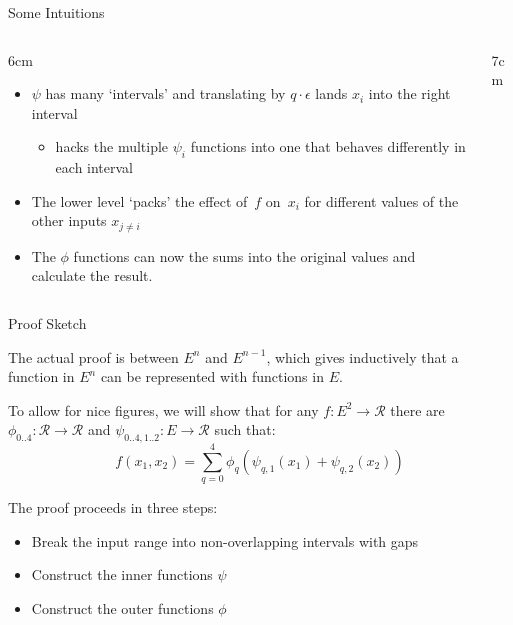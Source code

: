 \begin{frame}{Some Intuitions}

\begin{columns}

  \begin{column}{6cm}
  \begin{itemize}
  \item $\psi$ has many `intervals' and translating by $q\cdot\epsilon$
    lands $x_i$ into the right interval
    \begin{itemize}
    \item hacks the multiple $\psi_i$ functions into one that
      behaves differently in each interval
    \end{itemize}
  \item The lower level `packs' the effect of~$f$ on~$x_i$ for
    different values of the other inputs $x_{j\neq i}$
  \item The $\phi$ functions can now  the sums into
    the original values and calculate the result.
  \end{itemize}
  \end{column}

  \begin{column}{7cm}
  
  \end{column}

\end{columns}

\end{frame}


\begin{frame}{Proof Sketch}

The actual proof is between $E^n$ and $E^{n-1}$, which gives inductively
that a function in $E^n$ can be represented with functions in $E$.

To allow for nice figures, we will show that for any $f:E^2\rightarrow\mathcal{R}$
there are $\phi_{0..4}:\mathcal{R}\rightarrow\mathcal{R}$
and $\psi_{0..4,1..2}:E\rightarrow\mathcal{R}$ such that:
$$
f(x_1,x_2)=\sum_{q=0}^4\phi_q\left(\psi_{q,1}\left(x_1\right)+\psi_{q,2}\left(x_2\right)\right)
$$

The proof proceeds in three steps:
%
\begin{itemize}
\item Break the input range into non-overlapping intervals with gaps
\item Construct the inner functions $\psi$
\item Construct the outer functions $\phi$
\end{itemize}
\end{frame}



